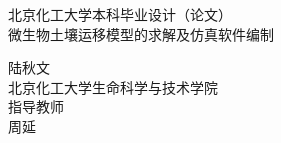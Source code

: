 \begin{titlepage}
\thispagestyle{empty}
\newcommand{\HRule}{\rule{\linewidth}{0.5mm}} %

{\center %
 

\vspace*{1.2cm}
\textsc{ 北京化工大学本科毕业设计（论文）}\\[2.8cm] %


\vspace*{1.2cm}
{\heiti{} 微生物土壤运移模型的求解及仿真软件编制}\\[1cm] %
\vspace*{1.2cm}
 

{\kaishu\large
陆秋文\\
北京化工大学生命科学与技术学院\\[0.5cm]}
指导教师\\
{\large\kaishu 周\quad 延}

}
\end{titlepage}
